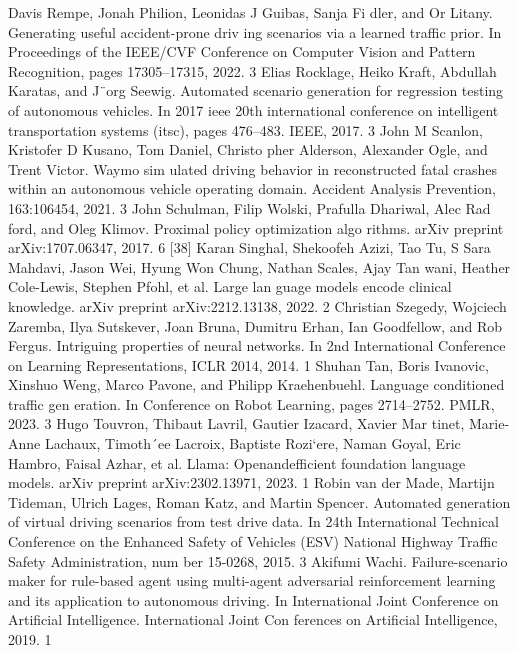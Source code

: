 \documentclass{article}
\begin{document}
\begin{thebibliography}{99}
	Davis Rempe, Jonah Philion, Leonidas J Guibas, Sanja Fi dler, and Or Litany. Generating useful accident-prone driv ing scenarios via a learned traffic prior. In Proceedings of the IEEE/CVF Conference on Computer Vision and Pattern Recognition, pages 17305–17315, 2022. 3
	Elias Rocklage, Heiko Kraft, Abdullah Karatas, and J¨org Seewig. Automated scenario generation for regression testing of autonomous vehicles. In 2017 ieee 20th international conference on intelligent transportation systems (itsc), pages 476–483. IEEE, 2017. 3 
	John M Scanlon, Kristofer D Kusano, Tom Daniel, Christo pher Alderson, Alexander Ogle, and Trent Victor. Waymo sim ulated driving behavior in reconstructed fatal crashes within an autonomous vehicle operating domain. Accident Analysis Prevention, 163:106454, 2021. 3 
	John Schulman, Filip Wolski, Prafulla Dhariwal, Alec Rad ford, and Oleg Klimov. Proximal policy optimization algo rithms. arXiv preprint arXiv:1707.06347, 2017. 6 [38] Karan Singhal, Shekoofeh Azizi, Tao Tu, S Sara Mahdavi, Jason Wei, Hyung Won Chung, Nathan Scales, Ajay Tan wani, Heather Cole-Lewis, Stephen Pfohl, et al. Large lan guage models encode clinical knowledge. arXiv preprint arXiv:2212.13138, 2022. 2 
	Christian Szegedy, Wojciech Zaremba, Ilya Sutskever, Joan Bruna, Dumitru Erhan, Ian Goodfellow, and Rob Fergus. Intriguing properties of neural networks. In 2nd International Conference on Learning Representations, ICLR 2014, 2014. 1 
	Shuhan Tan, Boris Ivanovic, Xinshuo Weng, Marco Pavone, and Philipp Kraehenbuehl. Language conditioned traffic gen eration. In Conference on Robot Learning, pages 2714–2752. PMLR, 2023. 3 
	Hugo Touvron, Thibaut Lavril, Gautier Izacard, Xavier Mar tinet, Marie-Anne Lachaux, Timoth´ee Lacroix, Baptiste Rozi`ere, Naman Goyal, Eric Hambro, Faisal Azhar, et al. Llama: Openandefficient foundation language models. arXiv preprint arXiv:2302.13971, 2023. 1 
	Robin van der Made, Martijn Tideman, Ulrich Lages, Roman Katz, and Martin Spencer. Automated generation of virtual driving scenarios from test drive data. In 24th International Technical Conference on the Enhanced Safety of Vehicles (ESV) National Highway Traffic Safety Administration, num ber 15-0268, 2015. 3
	Akifumi Wachi. Failure-scenario maker for rule-based agent using multi-agent adversarial reinforcement learning and its application to autonomous driving. In International Joint Conference on Artificial Intelligence. International Joint Con ferences on Artificial Intelligence, 2019. 1

\end{thebibliography}
\end{document}
